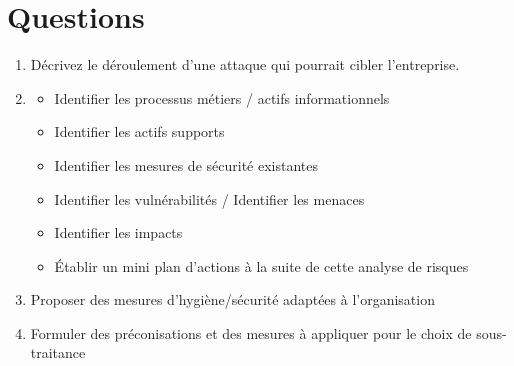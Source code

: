 \documentclass[a4paper,12pt]{article}
\begin{document}
\section{Questions}
\begin{enumerate}
    \item  Décrivez le déroulement d’une attaque qui pourrait cibler l’entreprise.
    \item \begin{itemize}
        \item Identifier les processus métiers / actifs informationnels
        \item Identifier les actifs supports
        \item Identifier les mesures de sécurité existantes
        \item Identifier les vulnérabilités / Identifier les menaces
        \item Identifier les impacts 
        \item Établir un mini plan d’actions à la suite de cette analyse de risques
    \end{itemize}
    \item Proposer des mesures d’hygiène/sécurité adaptées à l’organisation
    \item Formuler des préconisations et des mesures à appliquer pour le choix de sous-traitance
\end{enumerate}
\end{document}
